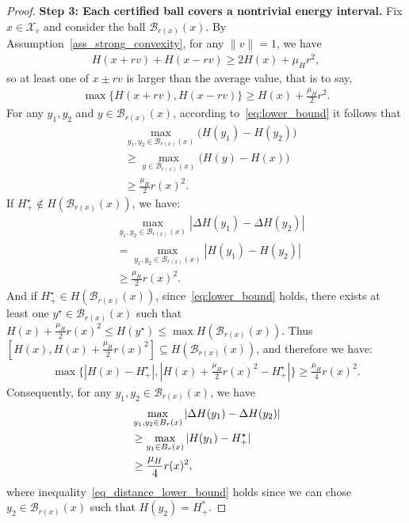 \documentclass[10pt,a4paper]{amsart}
\newcommand{\X}{\mathcal{X}}
\newcommand{\cB}{\mathcal{B}}
\begin{document}
\begin{proof}
\noindent\textbf{Step 3: Each certified ball covers a nontrivial energy interval.}
Fix $x\in\X_c$ and consider the ball $\cB_{r(x)}(x)$.
By Assumption~\ref{ass_strong_convexity}, for any $\|v\|=1$, we have
\begin{align*}
H(x+rv)+H(x-rv)\ge2H(x)+ \mu_H r^2,
\end{align*}
so at least one of $x\pm rv$ is larger than the average value, that is to say, 
\begin{align}
\label{eq:lower_bound}
\max \{H(x+rv),H(x-rv)\}\geq H(x)+\frac{\mu_H }{2}r^2.
\end{align}
For any $y_1, y_2$ and $y\in \cB_{r(x)}(x)$, according to~\eqref{eq:lower_bound} it follows that
\begin{align*}
& \max_{y_1,y_2\in \cB_{r(x)}(x)} \bigl(H(y_1)-H(y_2)\bigr)\\
& \ge \max_{y\in \cB_{r(x)}(x)} \bigl(H(y)-H(x)\bigr)\\
& \ge \frac{\mu_{H}}{2}r(x)^2.
\end{align*}
If $H_+^\star\notin H(\cB_{r(x)}(x))$, we have: 
\begin{align*}
    &\max_{y_1,y_2\in \cB_{r(x)}(x)} |\Delta H(y_1)-\Delta H(y_2)|\\
    &=\max_{y_1,y_2\in \cB_{r(x)}(x)} |H(y_1)-H(y_2)|\\
    &\geq \frac{\mu_{H}}{2}r(x)^2.
\end{align*}
And if $H_+^\star\in H(\cB_{r(x)}(x))$, since~\eqref{eq:lower_bound} holds, there exists at least one $y^\star \in \cB_{r(x)}(x)$ such that $H(x)+\frac{\mu_{H}}{2}r(x)^2 \le H(y^\star) \le \max H(\cB_{r(x)}(x))$. Thus $[H(x),H(x)+\frac{\mu_{H}}{2}r(x)^2]\subseteq H(\cB_{r(x)}(x))$, and therefore we have:
\begin{align*}
    \max\{|H(x)-H_+^\star|,|H(x)+\frac{\mu_{H}}{2}r(x)^2-H_+^\star|\}\geq \frac{\mu_{H}}{4}r(x)^2.
\end{align*}
Consequently, for any $y_1, y_2 \in \cB_{r(x)}(x)$, we have
\begin{align}
&\max_{y_1,y_2\in B_r(x)} |\Delta H(y_1)-\Delta H(y_2)| \notag\\
& \ge \max_{y_1\in B_r(x)}|H(y_1)-H_+^\star| \label{eq_distance_lower_bound}\\
& \geq \frac{\mu_{H}}{4}r(x)^2,\notag
\end{align}
where inequality~\eqref{eq_distance_lower_bound} holds since we can chose $y_2 \in \cB_{r(x)}(x)$ such that $H(y_2) = H_+^*$. 


\end{proof}
\end{document}
